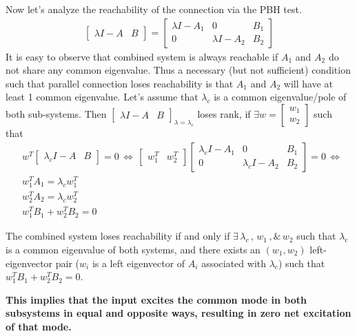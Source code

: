 \documentclass[twoside]{article}
\begin{document}
Now let's analyze the reachability of the connection via the PBH test. 
%
\begin{align*}
	\left[ \begin{array}{c|c} \lambda I - A & B \end{array} \right]
	= 
	\left[ \begin{array}{c|c|c} \lambda I - A_1 & 0 & B_1 \\ \hline 0 &  \lambda I - A_2 & B_2 
	\end{array} \right]
\end{align*}
%
It is easy to observe that combined system is always reachable if $A_1$ 
and $A_2$ do not share any common eigenvalue. Thus a necessary (but not sufficient) condition 
such that parallel connection loses reachability is that $A_1$ and $A_2$ will have at least 1 
common eigenvalue. Let's assume that $\lambda_c$ is a common eigenvalue/pole of both sub-systems.
Then $\left[ \begin{array}{c|c} \lambda I - A & B \end{array} \right]_{\lambda = \lambda_c}$ 
loses rank, if $\exists w = \begin{bmatrix} w_1 \\ w_2 \end{bmatrix}$ such that 
%
%
\begin{align*}
	&w^T \left[ \begin{array}{c|c} \lambda_c I - A & B \end{array} \right] = 0 
	\, \iff \,  \begin{bmatrix} w_1^T & w_2^T \end{bmatrix} \left[ \begin{array}{c|c|c} \lambda_c I - A_1 & 0 & B_1  \\ \hline 0 &  \lambda_c I - A_2 & B_2 \end{array} \right]  = 0
	\, \iff \, 
	\\
	& w_1^T A_1 = \lambda_c w_1^T \\
	& w_2^T A_2 = \lambda_c w_2^T \\
	& w_1^T B_1 + w_2^T B_2 = 0
\end{align*}
%
\begin{tcolorbox}[takeawaybox, title=Key Takeaway: Reachability in Parallel]
The combined system loses reachability if and only if $\exists \, \lambda_c  \, , \, w_1 \, ,\& \, w_2$ such that 
$\lambda_c$ is a common eigenvalue of both systems, and there exists an $(w_1,w_2)$ left-eigenvector pair ($w_i$ is a left eigenvector of $A_i$ associated with $\lambda_c$)
such that $w_1^T B_1 + w_2^T B_2 = 0$. 

\vspace{2mm}
\textbf{This implies that the input excites the common mode in both subsystems in equal and opposite ways, resulting in zero net excitation of that mode.}
\end{tcolorbox}
\end{document}
